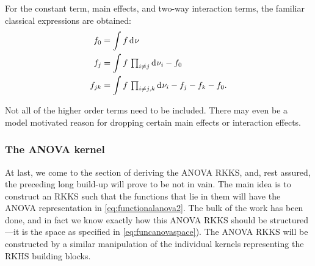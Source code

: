 
For the constant term, main effects, and two-way interaction terms, the familiar classical expressions are obtained:
\begin{align*}
  f_0 &= \int f \operatorname{d\!\:\!}\nu \\
  f_j &= \int f \, \textstyle\prod_{i\neq j} \operatorname{d\!\:\!}\nu_i  - f_0 \\
  f_{jk} &= \int f \, \textstyle\prod_{i\neq j,k} \operatorname{d\!\:\!}\nu_i  - f_j - f_k - f_0  .
\end{align*}



\begin{remark}
  Not all of the higher order terms need to be included. There may even be a model motivated reason for dropping certain main effects or interaction effects.  
\end{remark}


\subsubsection{The ANOVA kernel}

At last, we come to the section of deriving the ANOVA RKKS, and, rest assured, the preceding long build-up will prove to be not in vain.
The main idea is to construct an RKKS such that the functions that lie in them will have the ANOVA representation in \eqref{eq:functionalanova2}.
The bulk of the work has been done, and in fact we know exactly how this ANOVA RKKS should be structured---it is the space as specified in \eqref{eq:funcanovaspace}). 
The ANOVA RKKS will be constructed by a similar manipulation of the individual kernels representing the RKHS building blocks.

